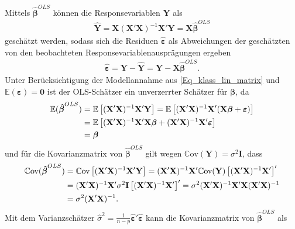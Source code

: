 \documentclass[12pt, a4paper]{report}\usepackage[]{graphicx}\usepackage[]{color}
\begin{document}
Mittels $\boldsymbol{\hat{\beta}}^{OLS}$ können die Responsevariablen $\mathbf{Y}$ als
\begin{align}\label{Eq_y_Schaetzung}
\mathbf{\hat{Y}}=\mathbf{X}(\mathbf{X}'\mathbf{X})^{-1}\mathbf{X}'\mathbf{Y}=\mathbf{X}\boldsymbol{\hat{\beta}}^{OLS}
\end{align}
geschätzt werden, sodass sich die Residuen $\boldsymbol{\hat{\varepsilon}}$ als Abweichungen der geschätzten von den beobachteten Responsevariablenausprägungen ergeben
\begin{align}
\boldsymbol{\hat{\varepsilon}}=\mathbf{Y}-\mathbf{\hat{Y}}=\mathbf{Y}-\mathbf{X}\boldsymbol{\hat{\beta}}^{OLS}.
\end{align}
Unter Berücksichtigung der Modellannahme aus \eqref{Eq_klass_lin_matrix} und $\mathbb{E}(\boldsymbol{\varepsilon})=\mathbf{0}$ ist der OLS-Schätzer ein unverzerrter Schätzer für $\boldsymbol{\beta}$, da
\begin{align}\label{Eq_Erwartungswert_OLS}
\mathbb{E}(\boldsymbol{\hat{\beta}}^{OLS})&=\mathbb{E}\left[(\mathbf{X}'\mathbf{X})^{-1}\mathbf{X}'\mathbf{Y}\right]=\mathbb{E}\left[(\mathbf{X}'\mathbf{X})^{-1}\mathbf{X}'(\mathbf{X}\boldsymbol{\beta}+\boldsymbol{\varepsilon})\right] \notag \\
&= \mathbb{E}\left[(\mathbf{X}'\mathbf{X})^{-1}\mathbf{X}'\mathbf{X}\boldsymbol{\beta} + (\mathbf{X}'\mathbf{X})^{-1}\mathbf{X}'\boldsymbol{\varepsilon} \right] \notag \\
&=\boldsymbol{\beta}
\end{align}
und für die Kovarianzmatrix von $\boldsymbol{\hat{\beta}}^{OLS}$ gilt wegen $\mathbb{C}\text{ov}(\mathbf{Y})=\sigma^2 \mathbf{I}$, dass
\begin{align}\label{Eq_Cov_OLS}
\mathbb{C}\text{ov}(\boldsymbol{\hat{\beta}}^{OLS})&=\mathbb{C}\text{ov}\left[(\mathbf{X}'\mathbf{X})^{-1}\mathbf{X}'\mathbf{Y}\right]=(\mathbf{X}'\mathbf{X})^{-1}\mathbf{X}' \mathbb{C}\text{ov}(\mathbf{Y})\left[(\mathbf{X}'\mathbf{X})^{-1}\mathbf{X}'\right]' \notag \\
&=(\mathbf{X}'\mathbf{X})^{-1}\mathbf{X}' \sigma^2 \mathbf{I}\left[(\mathbf{X}'\mathbf{X})^{-1}\mathbf{X}'\right]'=\sigma^2 (\mathbf{X}'\mathbf{X})^{-1}\mathbf{X}'\mathbf{X}(\mathbf{X}'\mathbf{X})^{-1} \notag \\
&=\sigma^2(\mathbf{X}'\mathbf{X})^{-1}.
\end{align}
Mit dem Varianzschätzer $\hat{\sigma}^2=\frac{1}{n-p}\boldsymbol{\hat{\varepsilon}}'\boldsymbol{\hat{\varepsilon}}$ kann die Kovarianzmatrix von $\boldsymbol{\hat{\beta}}^{OLS}$ als
\end{document}
